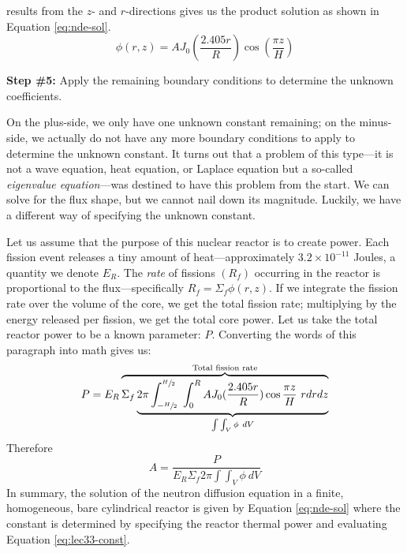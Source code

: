  results from the $z$- and $r$-directions gives us the product solution as shown in Equation \ref{eq:nde-sol}.
\begin{equation}
\phi(r,z) = A J_0(\frac{2.405 r}{R})\cos{(\frac{\pi z}{H})}
\label{eq:nde-sol}
\end{equation}

\vspace{0.25cm}

\noindent\textbf{Step \#5:} Apply the remaining boundary conditions to determine the unknown coefficients.

\vspace{0.25cm}

\noindent On the plus-side, we only have one unknown constant remaining; on the minus-side, we actually do not have any more boundary conditions to apply to determine the unknown constant.  It turns out that a problem of this type---it is not a wave equation, heat equation, or Laplace equation but a so-called \emph{eigenvalue equation}---was destined to have this problem from the start.  We can solve for the flux shape, but we cannot nail down its magnitude.  Luckily, we have a different way of specifying the unknown constant.

Let us assume that the purpose of this nuclear reactor is to create power.  Each fission event releases a tiny amount of heat---approximately $3.2\times 10^{-11}$ Joules, a quantity we denote $E_R$. The \emph{rate} of fissions $(R_f)$ occurring in the reactor is proportional to the flux---specifically $R_f = \Sigma_f \phi(r,z)$.  If we integrate the fission rate over the volume of the core, we get the total fission rate; multiplying by the energy released per fission, we get the total core power.  Let us take the total reactor power to be a known parameter: $P$.  Converting the words of this paragraph into math gives us:
\begin{equation}
P = E_R \overbrace{\Sigma_f  \underbrace{2 \pi \int_{-\sfrac{H}{2}}^{\sfrac{H}{2}} \ \int_0^R AJ_0(\frac{2.405 r}{R})\cos{\frac{\pi z}{H}} \ r dr dz}_{\int \int_{V} \phi \ dV}}^{\text{Total fission rate}}
\end{equation}
Therefore
\begin{equation}
A = \frac{P}{E_R \Sigma_f 2\pi \int \int_{V} \phi \ dV}
\label{eq:lec33-const}
\end{equation}
In summary, the solution of the neutron diffusion equation in a finite, homogeneous, bare cylindrical reactor is given by Equation \ref{eq:nde-sol} where the constant is determined by specifying the reactor thermal power and evaluating Equation \ref{eq:lec33-const}.

